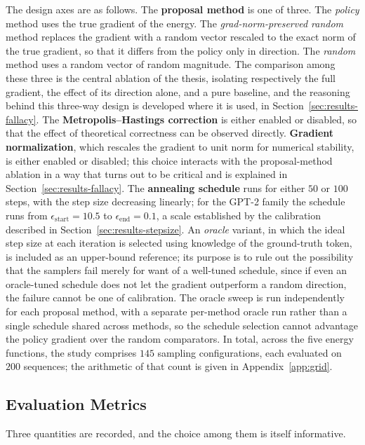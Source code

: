 The design axes are as follows. The \textbf{proposal method} is one of three. The \emph{policy} method uses the true gradient of the energy. The \emph{grad-norm-preserved random} method replaces the gradient with a random vector rescaled to the exact norm of the true gradient, so that it differs from the policy only in direction. The \emph{random} method uses a random vector of random magnitude. The comparison among these three is the central ablation of the thesis, isolating respectively the full gradient, the effect of its direction alone, and a pure baseline, and the reasoning behind this three-way design is developed where it is used, in Section~\ref{sec:results-fallacy}. The \textbf{Metropolis--Hastings correction} is either enabled or disabled, so that the effect of theoretical correctness can be observed directly. \textbf{Gradient normalization}, which rescales the gradient to unit norm for numerical stability, is either enabled or disabled; this choice interacts with the proposal-method ablation in a way that turns out to be critical and is explained in Section~\ref{sec:results-fallacy}. The \textbf{annealing schedule} runs for either $50$ or $100$ steps, with the step size decreasing linearly; for the GPT-2 family the schedule runs from $\epsilon_{\text{start}} = 10.5$ to $\epsilon_{\text{end}} = 0.1$, a scale established by the calibration described in Section~\ref{sec:results-stepsize}. An \emph{oracle} variant, in which the ideal step size at each iteration is selected using knowledge of the ground-truth token, is included as an upper-bound reference; its purpose is to rule out the possibility that the samplers fail merely for want of a well-tuned schedule, since if even an oracle-tuned schedule does not let the gradient outperform a random direction, the failure cannot be one of calibration. The oracle sweep is run independently for each proposal method, with a separate per-method oracle run rather than a single schedule shared across methods, so the schedule selection cannot advantage the policy gradient over the random comparators. In total, across the five energy functions, the study comprises $145$ sampling configurations, each evaluated on $200$ sequences; the arithmetic of that count is given in Appendix~\ref{app:grid}.

\subsection{Evaluation Metrics}
\label{sec:meth-metrics}

Three quantities are recorded, and the choice among them is itself informative.

